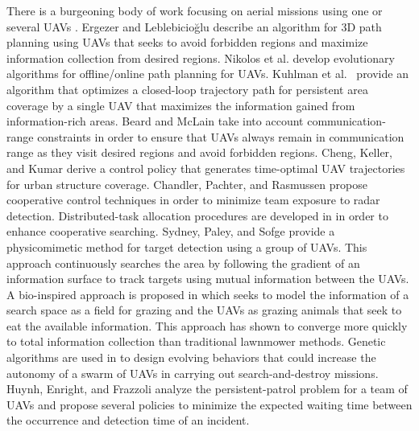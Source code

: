 \documentclass[letterpaper, 10pt, conference]{ieeeconf}
\begin{document}
There is a burgeoning body of work focusing on aerial missions using
one or several UAVs \cite{ryan2004overview,goerzen2010survey}. Ergezer
and Leblebicio{\u{g}}lu \cite{ErgezerL14} describe an algorithm for 3D
path planning using UAVs that seeks to avoid forbidden regions and
maximize information collection from desired regions.  Nikolos et al.
\cite{nikolos2003evolutionary} develop evolutionary algorithms for
offline/online path planning for UAVs. Kuhlman et al.~\cite{Kuhlman14}
provide an algorithm that optimizes a closed-loop trajectory path for
persistent area coverage by a single UAV that maximizes the
information gained from information-rich areas.  Beard and McLain
\cite{beard2003multiple} take into account communication-range
constraints in order to ensure that UAVs always remain in
communication range as they visit desired regions and avoid forbidden
regions.  Cheng, Keller, and Kumar \cite{cheng2008time} derive a
control policy that generates time-optimal UAV trajectories for urban
structure coverage. Chandler, Pachter, and Rasmussen
\cite{chandler2001uav} propose cooperative control techniques
in order to minimize team exposure to radar
detection. Distributed-task allocation procedures are developed in
\cite{maza2007multiple,jin2003cooperative,lemaire2004distributed} in
order to enhance cooperative searching. Sydney, Paley, and Sofge
\cite{Sydney14} provide a physicomimetic method for target detection
using a group of UAVs. This approach continuously searches the area by
following the gradient of an information surface to track targets
using mutual information between the UAVs. A bio-inspired approach is
proposed in \cite{Apker14} which seeks to model the information of a
search space as a field for grazing and the UAVs as grazing animals
that seek to eat the available information.  This approach has shown
to converge more quickly to total information collection than
traditional lawnmower methods.  Genetic algorithms are used in
\cite{gaudiano2005evolving} to design evolving behaviors that could
increase the autonomy of a swarm of UAVs in carrying out
search-and-destroy missions. Huynh, Enright, and Frazzoli \cite{Huynh}
analyze the persistent-patrol problem for a team of UAVs and propose
several policies to minimize the expected waiting time between the
occurrence and detection time of an incident.
\end{document}

